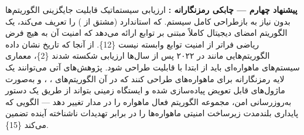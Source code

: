 \documentclass[a4paper,14pt]{extreport}
\begin{document}
\textbf{پیشنهاد چهارم --- چابکی رمزنگارانه :} ارزیابی سیستماتیک قابلیت جایگزینی الگوریتم‌ها بدون نیاز به بازطراحی کامل سیستم.  که استاندارد  (مشتق از ) را تعریف می‌کند، یک الگوریتم امضای دیجیتال کاملاً مبتنی بر توابع  ارائه می‌دهد که امنیت آن به هیچ فرض ریاضی فراتر از امنیت توابع  وابسته نیست \{12\}. از آنجا که تاریخ نشان داده الگوریتم‌هایی مانند  در ۲۰۲۲ پس از سال‌ها ارزیابی شکسته شدند \{2\}، معماری سیستم‌های ماهواره‌ای باید از ابتدا با قابلیت  طراحی شود. پژوهش‌های آتی می‌توانند یک لایه  رمزنگارانه برای ماهواره‌های  طراحی کنند که در آن الگوریتم‌های ، ،  و  به‌صورت ماژول‌های قابل تعویض پیاده‌سازی شده و ایستگاه زمینی بتواند از طریق یک دستور به‌روزرسانی  امن، مجموعه الگوریتم فعال ماهواره را در مدار تغییر دهد --- الگویی که پایداری بلندمدت زیرساخت امنیتی ماهواره‌ها را در برابر تهدیدات ناشناخته آینده تضمین می‌کند \{15\}.

\end{document}
